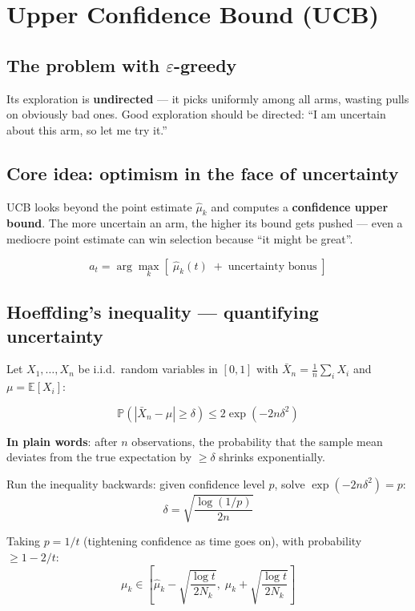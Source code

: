 \documentclass{article}
\begin{document}
\section*{Upper Confidence Bound (UCB)}

\subsection*{The problem with $\varepsilon$-greedy}

Its exploration is \textbf{undirected} --- it picks uniformly among all arms, wasting pulls on obviously bad ones. Good exploration should be directed: ``I am uncertain about this arm, so let me try it.''

\subsection*{Core idea: optimism in the face of uncertainty}

UCB looks beyond the point estimate $\hat{\mu}_k$ and computes a \textbf{confidence upper bound}. The more uncertain an arm, the higher its bound gets pushed --- even a mediocre point estimate can win selection because ``it might be great''.

\[
\boxed{a_t = \arg\max_k \left[\; \hat{\mu}_k(t) \;+\; \text{uncertainty bonus} \;\right]}
\]

\subsection*{Hoeffding's inequality --- quantifying uncertainty}

Let $X_1,\ldots,X_n$ be i.i.d.\ random variables in $[0,1]$ with $\bar{X}_n = \frac{1}{n}\sum_i X_i$ and $\mu = \mathbb{E}[X_i]$:

\[
\boxed{\mathbb{P}\left(|\bar{X}_n - \mu| \ge \delta\right) \le 2\exp\left(-2n\delta^2\right)}
\]

\textbf{In plain words}: after $n$ observations, the probability that the sample mean deviates from the true expectation by $\ge \delta$ shrinks exponentially.

Run the inequality backwards: given confidence level $p$, solve $\exp(-2n\delta^2)=p$:
\[
\delta = \sqrt{\frac{\log(1/p)}{2n}}
\]

Taking $p = 1/t$ (tightening confidence as time goes on), with probability $\ge 1-2/t$:
\[
\mu_k \in \left[\hat{\mu}_k - \sqrt{\frac{\log t}{2 N_k}},\; \hat{\mu}_k + \sqrt{\frac{\log t}{2 N_k}}\right]
\]
\end{document}
